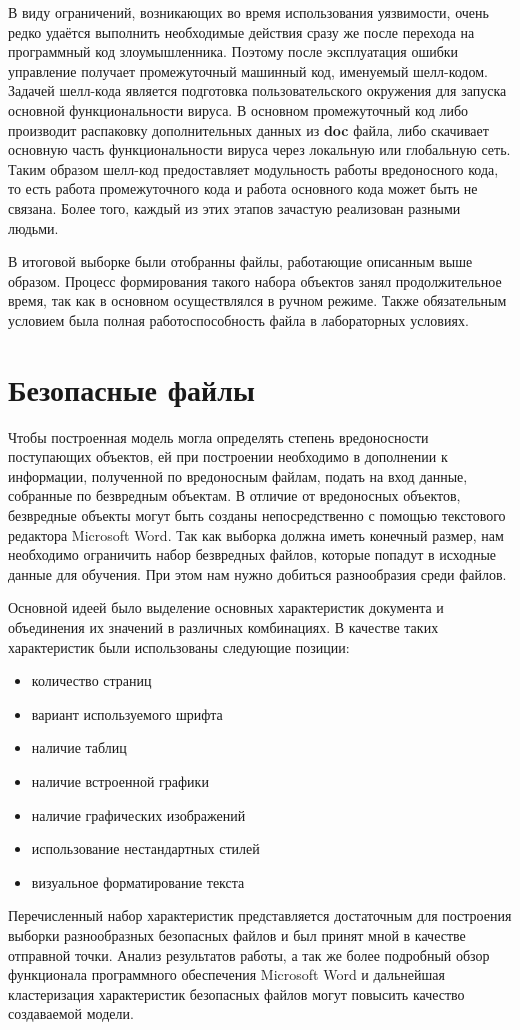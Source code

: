 В виду ограничений, возникающих во время использования уязвимости, очень редко удаётся выполнить необходимые действия сразу же после перехода на программный код злоумышленника.
Поэтому после эксплуатация ошибки управление получает промежуточный машинный код, именуемый шелл-кодом.
Задачей шелл-кода является подготовка пользовательского окружения для запуска основной функциональности вируса.
В основном промежуточный код либо производит распаковку дополнительных данных из \textbf{doc} файла, либо скачивает основную часть функциональности вируса через локальную или глобальную сеть.
Таким образом шелл-код предоставляет модульность работы вредоносного кода, то есть работа промежуточного кода и работа основного кода может быть не связана.
Более того, каждый из этих этапов зачастую реализован разными людьми.

В итоговой выборке были отобранны файлы, работающие описанным выше образом.
Процесс формирования такого набора объектов занял продолжительное время, так как в основном осуществлялся в ручном режиме.
Также обязательным условием была полная работоспособность файла в лабораторных условиях.

\section{Безопасные файлы}

Чтобы построенная модель могла определять степень вредоносности поступающих объектов, ей при построении необходимо в дополнении к информации, полученной по вредоносным файлам, подать на вход данные, собранные по безвредным объектам.
В отличие от вредоносных объектов, безвредные объекты могут быть созданы непосредственно с помощью текстового редактора Microsoft Word.
Так как выборка должна иметь конечный размер, нам необходимо ограничить набор безвредных файлов, которые попадут в исходные данные для обучения.
При этом нам нужно добиться разнообразия среди файлов.

Основной идеей было выделение основных характеристик документа и объединения их значений в различных комбинациях.
В качестве таких характеристик были использованы следующие позиции:
\begin{itemize}
\item количество страниц
\item вариант используемого шрифта
\item наличие таблиц
\item наличие встроенной графики
\item наличие графических изображений
\item использование нестандартных стилей
\item визуальное форматирование текста
\end{itemize}

Перечисленный набор характеристик представляется достаточным для построения выборки разнообразных безопасных файлов и был принят мной в качестве отправной точки.
Анализ результатов работы, а так же более подробный обзор функционала программного обеспечения Microsoft Word и дальнейшая кластеризация характеристик безопасных файлов могут повысить качество создаваемой модели.